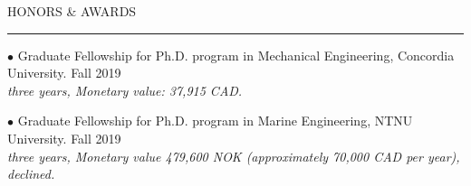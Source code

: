 \documentclass[10.5pt]{article}
\begin{document}
		
		
		
		
		
		
		
		
		
		
		
		
		\vspace{2.5mm}
		
		\noindent HONORS \& AWARDS
		
		\vspace{-2mm}
		
		\noindent\rule[0.5ex]{\linewidth}{1pt}
	
		{\noindent $\bullet$ Graduate Fellowship for Ph.D. program in Mechanical Engineering, Concordia University.} \hfill {Fall 2019} 
		\\ \textit{three years, Monetary value: 37,915 CAD.}
		
		\vspace{1.5mm}
		
		{\noindent $\bullet$ Graduate Fellowship for Ph.D. program in Marine Engineering, NTNU University.} \hfill {Fall 2019} 
		\\ \textit{three years, Monetary value 479,600 NOK (approximately 70,000 CAD per year), declined.}
		\vspace{1.5mm}
	
\end{document}
